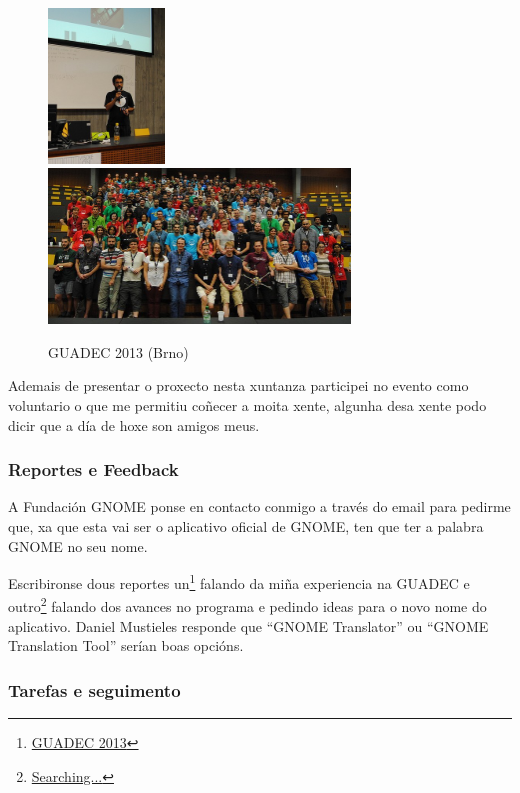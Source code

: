\begin{figure}[h!]
    \centering
    \includegraphics[width=0.275\textwidth]{img/guadec_2013_1.jpg}
    \includegraphics[width=0.715\textwidth]{img/guadec_2013_2.jpg}
    \caption{GUADEC 2013 (Brno)}
    \label{fig:guadec2012}
\end{figure}

Ademais de presentar o proxecto nesta xuntanza participei no evento como voluntario o que me permitiu coñecer a moita xente, algunha desa xente podo dicir que a día de hoxe son amigos meus.

\subsubsection{Reportes e Feedback}

A Fundación GNOME ponse en contacto conmigo a través do email para pedirme que, xa que esta vai ser o aplicativo oficial de GNOME, ten que ter a palabra GNOME no seu nome.

Escribironse dous reportes un\footnote{\href{http://aquelando.info/guadec-2013/}{GUADEC 2013}} falando da miña experiencia na GUADEC e outro\footnote{\href{http://aquelando.info/searching/}{Searching...}} falando dos avances no programa e pedindo ideas para o novo nome do aplicativo. Daniel Mustieles responde que ``GNOME Translator'' ou ``GNOME Translation Tool'' serían boas opcións.

\subsubsection{Tarefas e seguimento}

